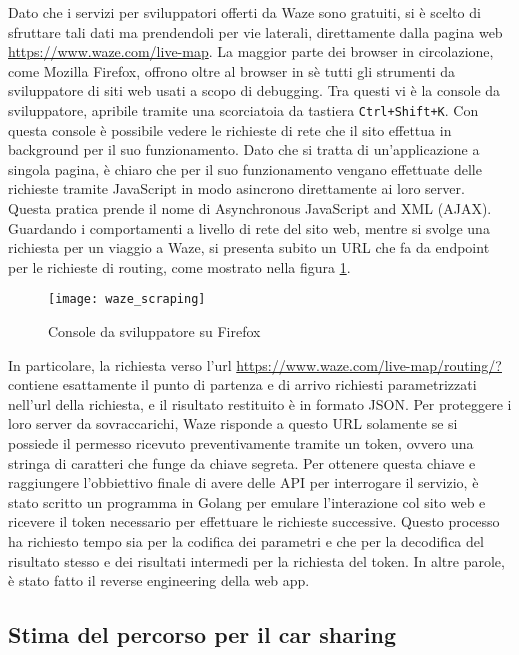Dato che i servizi per sviluppatori offerti da Waze sono gratuiti, si è scelto di sfruttare tali dati ma prendendoli per vie laterali, direttamente dalla pagina web \url{https://www.waze.com/live-map}. La maggior parte dei browser in circolazione, come Mozilla Firefox, offrono oltre al browser in sè tutti gli strumenti da sviluppatore di siti web usati a scopo di debugging. Tra questi vi è la console da sviluppatore, apribile tramite una scorciatoia da tastiera \texttt{Ctrl+Shift+K}. Con questa console è possibile vedere le richieste di rete che il sito effettua in background per il suo funzionamento. Dato che si tratta di un'applicazione a singola pagina, è chiaro che per il suo funzionamento vengano effettuate delle richieste tramite JavaScript in modo asincrono direttamente ai loro server. Questa pratica prende il nome di Asynchronous JavaScript and XML (AJAX)\cite{ajaxwiki}. Guardando i comportamenti a livello di rete del sito web, mentre si svolge una richiesta per un viaggio a Waze, si presenta subito un URL che fa da endpoint per le richieste di routing, come mostrato nella figura \ref{image:1}.
\begin{figure}
	\texttt{[image: waze\_scraping]}
	\caption{Console da sviluppatore su Firefox}
	\label{image:1}
\end{figure}
In particolare, la richiesta verso l'url \url{https://www.waze.com/live-map/routing/?} contiene esattamente il punto di partenza e di arrivo richiesti parametrizzati nell'url della richiesta, e il risultato restituito è in formato JSON. Per proteggere i loro server da sovraccarichi, Waze risponde a questo URL solamente se si possiede il permesso ricevuto preventivamente tramite un token, ovvero una stringa di caratteri che funge da chiave segreta. Per ottenere questa chiave e raggiungere l'obbiettivo finale di avere delle API per interrogare il servizio, è stato scritto un programma in Golang per emulare l'interazione col sito web e ricevere il token necessario per effettuare le richieste successive. Questo processo ha richiesto tempo sia per la codifica dei parametri e che per la decodifica del risultato stesso e dei risultati intermedi per la richiesta del token. In altre parole, è stato fatto il reverse engineering della web app.

\subsection{Stima del percorso per il car sharing}

